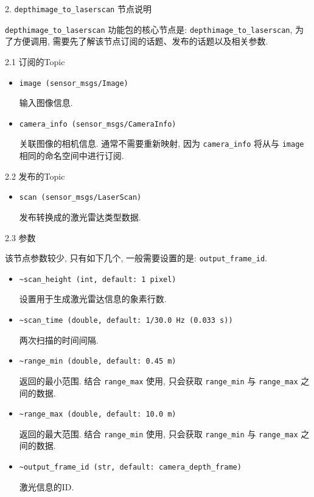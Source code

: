 \documentclass[openany, fontset=windowsold]{ctexbook}
\theoremstyle{kaiti}
\theoremstyle{normal}
\begin{document}
2. \verb|depthimage_to_laserscan| 节点说明

\verb|depthimage_to_laserscan| 功能包的核心节点是: \verb|depthimage_to_laserscan|, 为了方便调用, 需要先了解该节点订阅的话题、发布的话题以及相关参数.

2.1 订阅的Topic

\begin{itemize}
  \item \verb|image (sensor_msgs/Image)|

  输入图像信息.

  \item \verb|camera_info (sensor_msgs/CameraInfo)|

  关联图像的相机信息. 通常不需要重新映射, 因为 \verb|camera_info| 将从与 \verb|image| 相同的命名空间中进行订阅.
\end{itemize}

2.2 发布的Topic

\begin{itemize}
  \item \verb|scan (sensor_msgs/LaserScan)|

  发布转换成的激光雷达类型数据.
\end{itemize}

2.3 参数

该节点参数较少, 只有如下几个, 一般需要设置的是: \verb|output_frame_id|.

\begin{itemize}
  \item \verb|~scan_height (int, default: 1 pixel)|

  设置用于生成激光雷达信息的象素行数.

  \item \verb|~scan_time (double, default: 1/30.0 Hz (0.033 s))|

  两次扫描的时间间隔.

  \item \verb|~range_min (double, default: 0.45 m)|

  返回的最小范围. 结合 \verb|range_max| 使用, 只会获取 \verb|range_min| 与 \verb|range_max| 之间的数据.

  \item \verb|~range_max (double, default: 10.0 m)|

  返回的最大范围. 结合 \verb|range_min| 使用, 只会获取 \verb|range_min| 与 \verb|range_max| 之间的数据.

  \item \verb|~output_frame_id (str, default: camera_depth_frame)|

  激光信息的ID.
\end{itemize}
\end{document}
